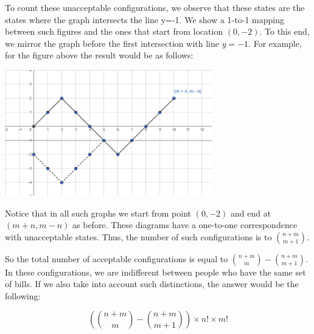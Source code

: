 \begin{solution}
To count these unacceptable configurations, we observe that these states are the states where the graph intersects the line y=-1. We show a 1-to-1 mapping between such figures and the ones that start from location $(0,-2)$. To this end, we mirror the graph before the first intersection with line $y=-1$. For example, for the figure above the result would be as follows:

\begin{center}
	\includegraphics[width=9cm]{26/figs/26_diagram3.png}
\end{center}

Notice that in all such graphs we start from point $(0,-2)$ and end at $(m+n, m-n)$ as before. These diagrams have a one-to-one correspondence with unacceptable states. Thus, the number of such configurations is to ${n+m \choose m+1}$.

So the total number of acceptable configurations is equal to ${n+m \choose m} - {n+m \choose m+1}$. In these configurations, we are indifferent between people who have the same set of bills.
If we also take into account such distinctions, the answer would be the following:

$$
({n+m \choose m} - {n+m \choose m+1}) \times n! \times m!
$$



\end{solution}